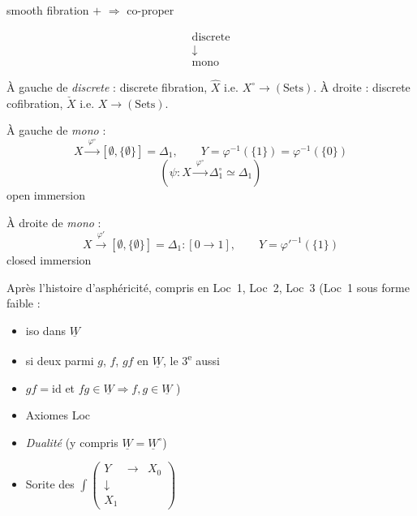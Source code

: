 \documentclass[11pt,a4paper]{article}
\begin{document}
smooth \struck{\ill{}} fibration \quad $+$ \quad {} $\Rightarrow$ co-proper

\[
  \begin{array}{c} \text{discrete} \\ \downarrow \\ \text{mono} \end{array}
\]

À gauche de \emph{discrete} : discrete fibration, $\hat{X}$ i.e. $X^{\circ} \to (\mathrm{Sets})$. À droite : discrete cofibration, $\check{X}$ i.e. $X \to (\mathrm{Sets})$.

À gauche de \emph{mono} :
\[
  X \xrightarrow{\ \varphi^{\circ}\ } [\emptyset, \{\emptyset\}] = \Delta_1, \qquad
  Y = \varphi^{-1}(\{1\}) = \varphi^{-1}(\{0\})
\]
\[
  (\psi : X \xrightarrow{\ \varphi^{\circ}\ } \Delta_1^{\circ} \simeq \Delta_1)
\]
open immersion

À droite de \emph{mono} :
\[
  X \xrightarrow{\ \varphi'\ } [\emptyset, \{\emptyset\}] = \Delta_1 : [0 \longrightarrow 1], \qquad
  Y = \varphi'^{-1}(\{1\})
\]
closed immersion

Après l'histoire d'asphéricité, \ill{} compris en Loc~1, Loc~2, Loc~3 (Loc~1 sous forme faible :
\begin{itemize}
  \item[a)] iso dans $\underline{W}$
  \item[b)] si deux parmi $g$, $f$, $gf$ en $\underline{W}$, le 3\textsuperscript{e} aussi
  \item[c)] $gf = \mathrm{id}$ et $fg \in \underline{W} \Longrightarrow f, g \in \underline{W}$ )
\end{itemize}

\begin{itemize}
  \item[(0)] Axiomes Loc 
  \item[(1)] \emph{Dualité} (y compris $\underline{W} = \underline{W}^{\circ}$)
  \item[(3)] Sorite des $\int \left(\begin{smallmatrix} Y & \to & X_0 \\ \downarrow & & \\ X_1 & & \end{smallmatrix}\right)$
\end{itemize}
\end{document}
